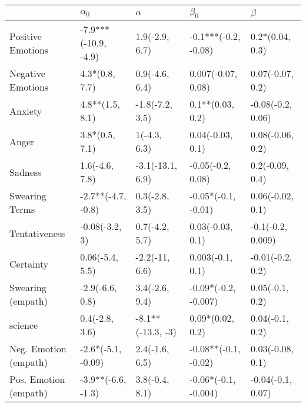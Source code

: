 \begin{tabular}{lllll}
\toprule
{} &            $\alpha_0$ &           $\alpha$ &             $\beta_0$ &            $\beta$ \\
\midrule
Positive Emotions     &  -7.9***(-10.9, -4.9) &     1.9(-2.9, 6.7) &  -0.1***(-0.2, -0.08) &    0.2*(0.04, 0.3) \\
Negative Emotions     &        4.3*(0.8, 7.7) &     0.9(-4.6, 6.4) &    0.007(-0.07, 0.08) &   0.07(-0.07, 0.2) \\
Anxiety               &       4.8**(1.5, 8.1) &    -1.8(-7.2, 3.5) &      0.1**(0.03, 0.2) &  -0.08(-0.2, 0.06) \\
Anger                 &        3.8*(0.5, 7.1) &       1(-4.3, 6.3) &      0.04(-0.03, 0.1) &   0.08(-0.06, 0.2) \\
Sadness               &        1.6(-4.6, 7.8) &   -3.1(-13.1, 6.9) &     -0.05(-0.2, 0.08) &    0.2(-0.09, 0.4) \\
Swearing Terms        &    -2.7**(-4.7, -0.8) &     0.3(-2.8, 3.5) &   -0.05*(-0.1, -0.01) &   0.06(-0.02, 0.1) \\
Tentativeness         &        -0.08(-3.2, 3) &     0.7(-4.2, 5.7) &      0.03(-0.03, 0.1) &  -0.1(-0.2, 0.009) \\
Certainty             &       0.06(-5.4, 5.5) &     -2.2(-11, 6.6) &      0.003(-0.1, 0.1) &   -0.01(-0.2, 0.2) \\
Swearing (empath)     &       -2.9(-6.6, 0.8) &     3.4(-2.6, 9.4) &  -0.09*(-0.2, -0.007) &    0.05(-0.1, 0.2) \\
science               &        0.4(-2.8, 3.6) &  -8.1**(-13.3, -3) &      0.09*(0.02, 0.2) &    0.04(-0.1, 0.2) \\
Neg. Emotion (empath) &    -2.6*(-5.1, -0.09) &     2.4(-1.6, 6.5) &  -0.08**(-0.1, -0.02) &   0.03(-0.08, 0.1) \\
Pos. Emotion (empath) &    -3.9**(-6.6, -1.3) &     3.8(-0.4, 8.1) &  -0.06*(-0.1, -0.004) &  -0.04(-0.1, 0.07) \\
\bottomrule
\end{tabular}
